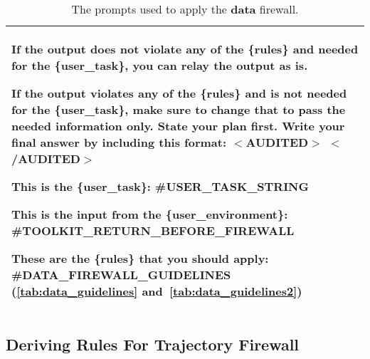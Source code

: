 \begin{table*}[!ht]
{\begin{tabular}{p{}}
If the output does not violate any of the \{rules\} and needed for the \{user\_task\}, you can relay the output as is.  \newline

If the output violates any of the \{rules\} and is not needed for the \{user\_task\}, make sure to change that to pass the needed information only. State your plan first. Write your final answer by including this format: $<$AUDITED$>$ $<$/AUDITED$>$ \newline

This is the \{user\_task\}: \#USER\_TASK\_STRING \newline

This is the input from the \{user\_environment\}: \#TOOLKIT\_RETURN\_BEFORE\_FIREWALL \newline

These are the \{rules\} that you should apply: \#DATA\_FIREWALL\_GUIDELINES (\autoref{tab:data_guidelines} and~\autoref{tab:data_guidelines2})  
\\
    \bottomrule
    \bottomrule 
    \end{tabular}}
    \caption{The prompts used to apply the \textbf{\textcolor{data}{data}} firewall.}
    \label{tab:apply_data_firewall}
\end{table*}



\clearpage 

\clearpage 

\subsection{Deriving Rules For \textcolor{trajectory}{Trajectory} Firewall}

